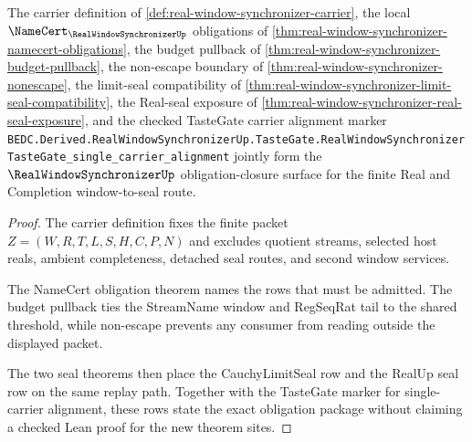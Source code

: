 \begin{theorem}
\label{thm:real-window-synchronizer-obligation-closure-package}
The carrier definition of \autoref{def:real-window-synchronizer-carrier}, the local $\NameCert_{\RealWindowSynchronizerUp}$ obligations of \autoref{thm:real-window-synchronizer-namecert-obligations}, the budget pullback of \autoref{thm:real-window-synchronizer-budget-pullback}, the non-escape boundary of \autoref{thm:real-window-synchronizer-nonescape}, the limit-seal compatibility of \autoref{thm:real-window-synchronizer-limit-seal-compatibility}, the Real-seal exposure of \autoref{thm:real-window-synchronizer-real-seal-exposure}, and the checked TasteGate carrier alignment marker
\texttt{BEDC.Derived.RealWindowSynchronizerUp.TasteGate.RealWindowSynchronizerTasteGate\_single\_carrier\_alignment}
jointly form the $\RealWindowSynchronizerUp$ obligation-closure surface for the finite Real and Completion window-to-seal route.
\end{theorem}
\begin{proof}
The carrier definition fixes the finite packet $Z=(W,R,T,L,S,H,C,P,N)$ and excludes quotient streams, selected host reals, ambient completeness, detached seal routes, and second window services.

The NameCert obligation theorem names the rows that must be admitted. The budget pullback ties the StreamName window and RegSeqRat tail to the shared threshold, while non-escape prevents any consumer from reading outside the displayed packet.

The two seal theorems then place the CauchyLimitSeal row and the RealUp seal row on the same replay path. Together with the TasteGate marker for single-carrier alignment, these rows state the exact obligation package without claiming a checked Lean proof for the new theorem sites.
\end{proof}

